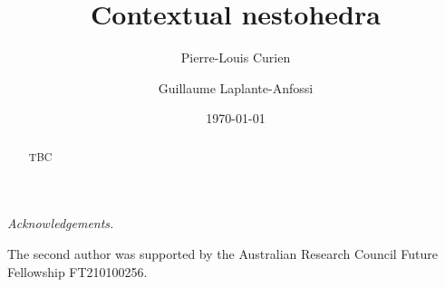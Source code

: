 \documentclass[11pt]{amsart}
\title{Contextual nestohedra}
\author{Pierre-Louis Curien}
\author{Guillaume Laplante-Anfossi}
\date{\today}
\begin{document}
\begin{abstract}
TBC
\end{abstract}

\maketitle

\setcounter{tocdepth}{1}







\bigskip

\emph{Acknowledgements.}   

The second author was supported by the Australian Research Council Future Fellowship FT210100256.




\end{document}
